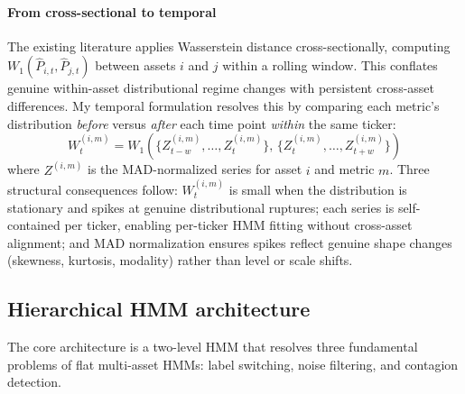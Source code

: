 \documentclass{article}
\begin{document}
\paragraph{From cross-sectional to temporal}
The existing literature \parencite{horvath2021clustering} applies Wasserstein
distance cross-sectionally, computing $W_1(\hat{P}_{i,t}, \hat{P}_{j,t})$
between assets $i$ and $j$ within a rolling window. This conflates genuine
within-asset distributional regime changes with persistent cross-asset
differences. My temporal formulation resolves this by comparing each metric's
distribution \textit{before} versus \textit{after} each time point
\textit{within} the same ticker:
\begin{equation}
W_t^{(i,m)} = W_1\!\left(\{Z_{t-w}^{(i,m)}, \ldots, Z_{t}^{(i,m)}\},\,
\{Z_{t}^{(i,m)}, \ldots, Z_{t+w}^{(i,m)}\}\right)
\label{eq:temporal_wass}
\end{equation}
where $Z^{(i,m)}$ is the MAD-normalized series for asset $i$ and metric $m$.
Three structural consequences follow: $W_t^{(i,m)}$ is small when the
distribution is stationary and spikes at genuine distributional ruptures; each
series is self-contained per ticker, enabling per-ticker HMM fitting without
cross-asset alignment; and MAD normalization ensures spikes reflect genuine
shape changes (skewness, kurtosis, modality) rather than level or scale shifts.

\subsection{Hierarchical HMM architecture}
\label{sec:hierarchical}

The core architecture is a two-level HMM that resolves three fundamental
problems of flat multi-asset HMMs: label switching, noise filtering, and
contagion detection.
\end{document}
